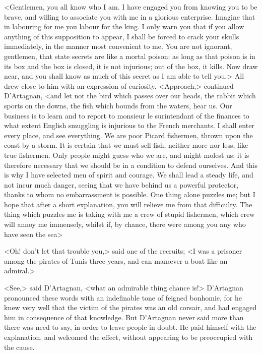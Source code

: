 <Gentlemen, you all know who I am. I have engaged you from knowing you to be brave, and willing to associate you with me in a glorious enterprise. Imagine that in labouring for me you labour for the king. I only warn you that if you allow anything of this supposition to appear, I shall be forced to crack your skulls immediately, in the manner most convenient to me. You are not ignorant, gentlemen, that state secrets are like a mortal poison: as long as that poison is in its box and the box is closed, it is not injurious; out of the box, it kills. Now draw near, and you shall know as much of this secret as I am able to tell you.> All drew close to him with an expression of curiosity. <Approach,> continued D'Artagnan, <and let not the bird which passes over our heads, the rabbit which sports on the downs, the fish which bounds from the waters, hear us. Our business is to learn and to report to monsieur le surintendant of the finances to what extent English smuggling is injurious to the French merchants. I shall enter every place, and see everything. We are poor Picard fishermen, thrown upon the coast by a storm. It is certain that we must sell fish, neither more nor less, like true fishermen. Only people might guess who we are, and might molest us; it is therefore necessary that we should be in a condition to defend ourselves. And this is why I have selected men of spirit and courage. We shall lead a steady life, and not incur much danger, seeing that we have behind us a powerful protector, thanks to whom no embarrassment is possible. One thing alone puzzles me; but I hope that after a short explanation, you will relieve me from that difficulty. The thing which puzzles me is taking with me a crew of stupid fishermen, which crew will annoy me immensely, whilst if, by chance, there were among you any who have seen the sea\longdash>

<Oh! don't let that trouble you,> said one of the recruits; <I was a prisoner among the pirates of Tunis three years, and can manœver a boat like an admiral.>

<See,> said D'Artagnan, <what an admirable thing chance is!> D'Artagnan pronounced these words with an indefinable tone of feigned bonhomie, for he knew very well that the victim of the pirates was an old corsair, and had engaged him in consequence of that knowledge. But D'Artagnan never said more than there was need to say, in order to leave people in doubt. He paid himself with the explanation, and welcomed the effect, without appearing to be preoccupied with the cause.

